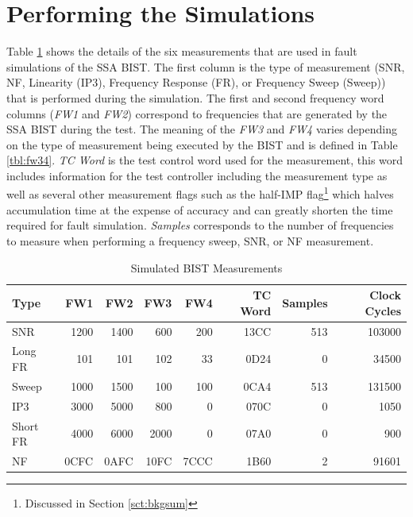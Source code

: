 \documentclass[12pt]{report}
\begin{document}
\section{Performing the Simulations}
Table \ref{tbl:faulttests} shows the details of the six measurements that are used in fault simulations of the SSA BIST.  The first column is the type of measurement (SNR, NF, Linearity (IP3), Frequency Response (FR), or Frequency Sweep (Sweep)) that is performed during the simulation.  The first and second frequency word columns (\textit{FW1} and \textit{FW2}) correspond to frequencies that are generated by the SSA BIST during the test.  The meaning of the \textit{FW3} and \textit{FW4} varies depending on the type of measurement being executed by the BIST and is defined in Table \ref{tbl:fw34}.  \textit{TC Word} is the test control word used for the measurement, this word includes information for the test controller including the measurement type as well as several other measurement flags such as the half-IMP flag\footnote{Discussed in Section \ref{sct:bkgsum}} which halves accumulation time at the expense of accuracy and can greatly shorten the time required for fault simulation.  \textit{Samples} corresponds to the number of frequencies to measure when performing a frequency sweep, SNR, or NF measurement.
\begin{table}
  \begin{center}
    \caption{Simulated BIST Measurements}
    \begin{tabular}{|l|r|r|r|r|r|r|r|}
      \hline
        Type & FW1 & FW2 & FW3 & FW4 & TC Word & Samples & Clock Cycles \\ \hline
        SNR & 1200 & 1400 & 600 & 200 & 13CC & 513 & 103000 \\ \hline
        Long FR & 101 & 101 & 102 & 33 & 0D24 & 0 & 34500 \\ \hline
        Sweep & 1000 & 1500 & 100 & 100 & 0CA4 & 513 & 131500\\ \hline
        IP3 & 3000 & 5000 & 800 & 0 & 070C & 0 & 1050 \\ \hline
        Short FR & 4000 & 6000 & 2000 & 0 & 07A0 & 0 & 900 \\ \hline
        NF & 0CFC & 0AFC & 10FC & 7CCC & 1B60 & 2 & 91601 \\
      \hline
    \end{tabular}
    \label{tbl:faulttests}
  \end{center}
\end{table}
\end{document}
